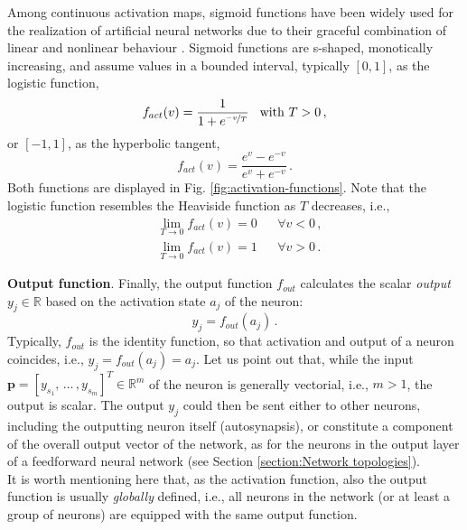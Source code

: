 \documentclass[12pt, a4paper, twoside, openright, notitlepage]{report}
\numberwithin{equation}{chapter}
\theoremstyle{theorem}
\theoremstyle{definition}
\theoremstyle{remark}
\theoremstyle{proposition}
\numberwithin{figure}{chapter}
\begin{document}
		Among continuous activation maps, sigmoid functions have been widely used for the realization of artificial neural networks due to their graceful combination of linear and nonlinear behaviour \cite{Hay05}. Sigmoid functions are s-shaped, monotically increasing, and assume values in a bounded interval, typically $[0,1]$, as the logistic function,
		\begin{equation}
			\label{eq:logistic}
			f_{act}(v) = \dfrac{1}{1 + e^{\nicefrac{-v}{T}}} \hspace*{0.3cm} \text{with $T > 0$} \, ,
		\end{equation}
		or $[-1,1]$, as the hyperbolic tangent,
		\begin{equation}
			\label{eq:hyperbolic-tangent}
			f_{act}(v) = \dfrac{e^{v} - e^{-v}}{e^v + e^{-v}} \, .
		\end{equation}
		Both functions are displayed in Fig. \ref{fig:activation-functions}. Note that the logistic function resembles the Heaviside function as $T$ decreases, i.e.,
		\begin{equation*}
			\begin{aligned}
				& \lim_{T \to 0} f_{act}(v) = 0 && \forall v < 0 \, , \\
				& \lim_{T \to 0} f_{act}(v) = 1 && \forall v > 0 \, .
			\end{aligned}
		\end{equation*}
				
		\vspace*{0.3cm}
		
		\noindent \textbf{Output function}. Finally, the output function $f_{out}$ calculates the scalar \emph{output} $y_j \in \mathbb{R}$ based on the activation state $a_j$ of the neuron:
		\begin{equation*}
			\label{eq:output-function}
			y_j = f_{out}(a_j) \, .
		\end{equation*} 
		Typically, $f_{out}$ is the identity function, so that activation and output of a neuron coincides, i.e., $y_j = f_{out}(a_j) = a_j$. Let us point out that, while the input $\mathbf{p} = [y_{s_1}, \, \ldots \, , y_{s_m}]^T \in \mathbb{R}^m$ of the neuron is generally vectorial, i.e., $m > 1$, the output is scalar. The output $y_j$ could then be sent either to other neurons, including the outputting neuron itself (autosynapsis), or constitute a component of the overall output vector of the network, as for the neurons in the output layer of a feedforward neural network (see Section \ref{section:Network topologies}). \\
		It is worth mentioning here that, as the activation function, also the output function is usually \emph{globally} defined, i.e., all neurons in the network (or at least a group of neurons) are equipped with the same output function.
		
\end{document}
